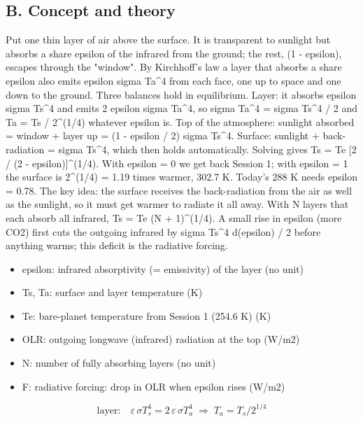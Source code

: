 \documentclass[11pt,a4paper]{article}
\begin{document}
\subsection*{B. Concept and theory}
Put one thin layer of air above the surface. It is transparent to sunlight but absorbs a share epsilon of the infrared from the ground; the rest, (1 - epsilon), escapes through the "window". By Kirchhoff's law a layer that absorbs a share epsilon also emits epsilon sigma Ta\textasciicircum{}4 from each face, one up to space and one down to the ground. Three balances hold in equilibrium. Layer: it absorbs epsilon sigma Ts\textasciicircum{}4 and emits 2 epsilon sigma Ta\textasciicircum{}4, so sigma Ta\textasciicircum{}4 = sigma Ts\textasciicircum{}4 / 2 and Ta = Ts / 2\textasciicircum{}(1/4) whatever epsilon is. Top of the atmosphere: sunlight absorbed = window + layer up = (1 - epsilon / 2) sigma Ts\textasciicircum{}4. Surface: sunlight + back-radiation = sigma Ts\textasciicircum{}4, which then holds automatically. Solving gives Ts = Te [2 / (2 - epsilon)]\textasciicircum{}(1/4). With epsilon = 0 we get back Session 1; with epsilon = 1 the surface is 2\textasciicircum{}(1/4) = 1.19 times warmer, 302.7 K. Today's 288 K needs epsilon = 0.78. The key idea: the surface receives the back-radiation from the air as well as the sunlight, so it must get warmer to radiate it all away. With N layers that each absorb all infrared, Ts = Te (N + 1)\textasciicircum{}(1/4). A small rise in epsilon (more CO2) first cuts the outgoing infrared by sigma Ts\textasciicircum{}4 d(epsilon) / 2 before anything warms; this deficit is the radiative forcing.

\begin{itemize}[nosep]
\item epsilon: infrared absorptivity (= emissivity) of the layer (no unit)
\item Ts, Ta: surface and layer temperature (K)
\item Te: bare-planet temperature from Session 1 (254.6 K) (K)
\item OLR: outgoing longwave (infrared) radiation at the top (W/m2)
\item N: number of fully absorbing layers (no unit)
\item F: radiative forcing: drop in OLR when epsilon rises (W/m2)
\end{itemize}

\begin{equation*}
\text{layer:}\quad \varepsilon\,\sigma T_s^4 = 2\,\varepsilon\,\sigma T_a^4 \;\Rightarrow\; T_a = T_s/2^{1/4}
\end{equation*}
\end{document}
